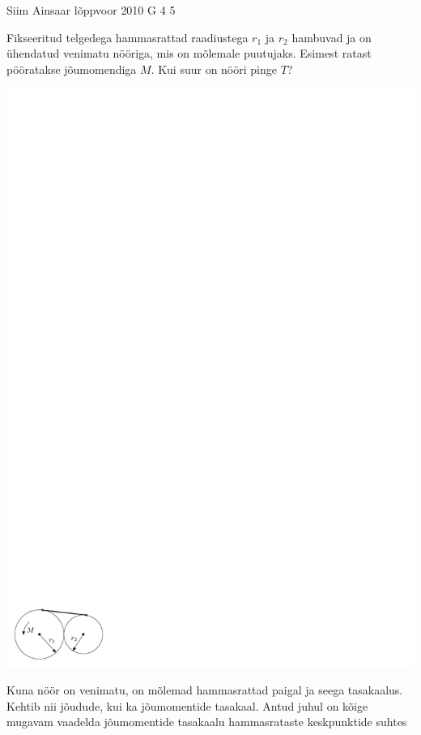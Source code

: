 {Siim Ainsaar} %
{lõppvoor} %
{2010} %
{G 4} %
{5} %
{
\ifStatement
Fikseeritud telgedega hammasrattad raadiustega $r_1$ ja $r_2$ hambuvad ja on
ühendatud venimatu nööriga,
mis on mõlemale puutujaks. Esimest ratast pööratakse
jõumomendiga $M$. Kui suur on nööri pinge $T$?

\begin{center}
	\includegraphics{2010-v3g-04-joonis_hr_ipe.pdf}
\end{center}
\fi


\ifHint
Kuna nöör on venimatu, on mõlemad hammasrattad paigal ja seega tasakaalus. Kehtib nii jõudude, kui ka jõumomentide tasakaal. Antud juhul on kõige mugavam vaadelda jõumomentide tasakaalu hammasrataste keskpunktide suhtes
\fi


}
